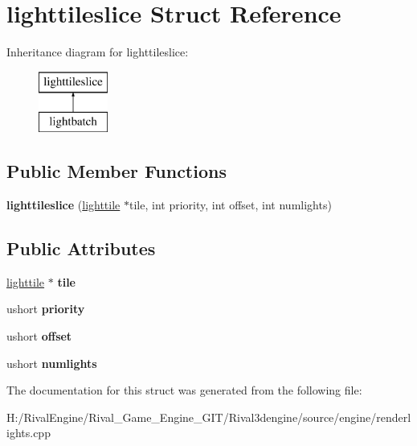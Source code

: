 \hypertarget{structlighttileslice}{}\section{lighttileslice Struct Reference}
\label{structlighttileslice}
Inheritance diagram for lighttileslice\+:\begin{figure}[H]
\begin{center}
\leavevmode
\includegraphics[height=2.000000cm]{structlighttileslice}
\end{center}
\end{figure}
\subsection*{Public Member Functions}
\begin{DoxyCompactItemize}
\item 
\mbox{\label{structlighttileslice_a4d18e390221a08171f587cc357f6f189}} 
{\bfseries lighttileslice} (\hyperlink{structlighttile}{lighttile} $\ast$tile, int priority, int offset, int numlights)
\end{DoxyCompactItemize}
\subsection*{Public Attributes}
\begin{DoxyCompactItemize}
\item 
\mbox{\label{structlighttileslice_a9b18ee66e31fd6ad897dc7247cd23cb9}} 
\hyperlink{structlighttile}{lighttile} $\ast$ {\bfseries tile}
\item 
\mbox{\label{structlighttileslice_a1829cddedd92c398b45793cd37d77fd1}} 
ushort {\bfseries priority}
\item 
\mbox{\label{structlighttileslice_ab67f0fc64d04aa9a8c5f052b1e630df1}} 
ushort {\bfseries offset}
\item 
\mbox{\label{structlighttileslice_aec69d262b13381c2cd038e6cf1372b9b}} 
ushort {\bfseries numlights}
\end{DoxyCompactItemize}


The documentation for this struct was generated from the following file\+:\begin{DoxyCompactItemize}
\item 
H\+:/\+Rival\+Engine/\+Rival\+\_\+\+Game\+\_\+\+Engine\+\_\+\+G\+I\+T/\+Rival3dengine/source/engine/renderlights.\+cpp\end{DoxyCompactItemize}
